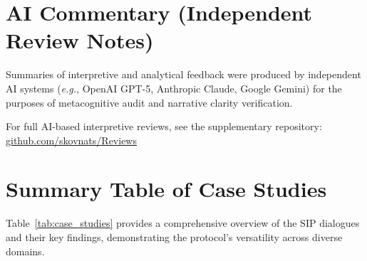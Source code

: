 \documentclass[11pt,a4paper]{article}
\begin{document}
\section*{AI Commentary (Independent Review Notes)}
Summaries of interpretive and analytical feedback were produced by independent AI systems 
(\textit{e.g.}, OpenAI GPT-5, Anthropic Claude, Google Gemini) 
for the purposes of metacognitive audit and narrative clarity verification.  

For full AI-based interpretive reviews, see the supplementary repository:  
\href{https://codeberg.org/skovnats/SVE-Systemic-Verification-Engineering/tree/master/Reviews}{github.com/skovnats/Reviews}





\clearpage
\appendix



\section{Summary Table of Case Studies}
\label{app:case_summary}

Table~\ref{tab:case_studies} provides a comprehensive overview of the SIP dialogues and their key findings, demonstrating the protocol's versatility across diverse domains.
\end{document}
